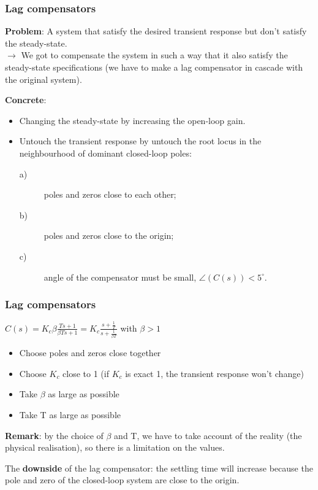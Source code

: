 \begin{frame}
	\frametitle{Lag compensators}
		 \textbf{Problem}: A system that satisfy the desired transient response but don't satisfy the steady-state. \\
		 $\rightarrow$ We got to compensate the system in such a way that it also satisfy the steady-state specifications (we have to make a lag compensator in cascade with the original system).
		 \vspace{4mm}
		  
		 \textbf{Concrete}:
		 \begin{itemize}
		 	\item Changing the steady-state by increasing the open-loop gain.
		 	\item Untouch the transient response by untouch the root locus in the neighbourhood of dominant closed-loop poles:
		 	\begin{description}
		 		\item [a)] poles and zeros close to each other;
		 		\item [b)] poles and zeros close to the origin;
		 		\item [c)] angle of the compensator must be small, $\angle(C(s))<5^{\circ}$.
		 	\end{description}
		 \end{itemize}
\end{frame}

\begin{frame}
	\frametitle{Lag compensators}
		$C(s)=K_c \beta\frac{Ts+1}{\beta Ts+1}= K_c\frac{s+\frac{1}{T}}{s+\frac{1}{\beta T}}$ with $\beta>1$\\
		\begin{itemize}
			\item Choose poles and zeros close together
			\item Choose $K_c$ close to 1 (if $K_c$ is exact 1, the transient response won't change)
			\item Take $\beta$ as large as possible
			\item Take T as large as possible 
		\end{itemize}
		\vspace{3mm}
		
		\textbf{Remark}: by the choice of $\beta$ and T, we have to take account of the reality (the physical realisation), so there is a limitation on the values.  \vspace{3mm}
		
		The \textbf{downside} of the lag compensator: the settling time will increase because the pole and zero of the closed-loop system are close to the origin. 
\end{frame}

